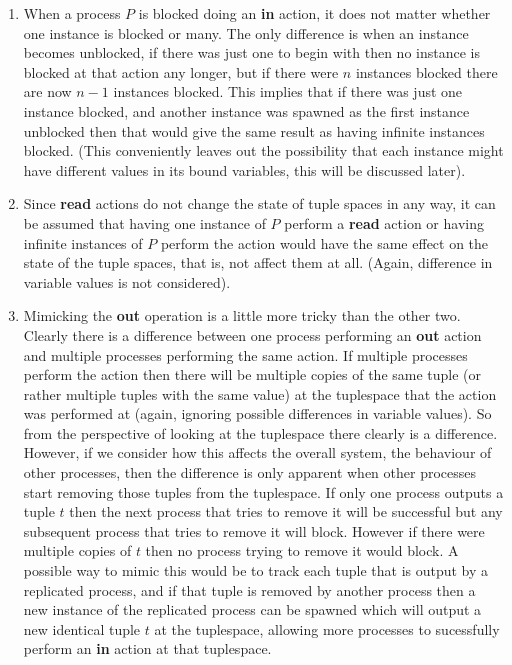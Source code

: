 	\begin{enumerate}
		\item When a process $P$ is blocked doing an \textbf{in} action, it does 
		not matter whether one instance is blocked or many. The only difference is 
		when an instance becomes unblocked, if there was just one to begin with 
		then no instance is blocked at that action any longer, but if there were 
		$n$ instances blocked there are now $n-1$ instances blocked. This implies
		that if there was just one instance blocked, and another instance was 
		spawned as the first instance unblocked then that would give the same 
		result as having infinite instances blocked. (This conveniently leaves
		out the possibility that each instance might have different values in its 
		bound variables, this will be discussed later).
	
		\item Since \textbf{read} actions do not change the state of tuple spaces
		in any way, it can be assumed that having one instance of $P$ perform a
		\textbf {read} action or having infinite instances of $P$ perform the 
		action would have the same effect on the state of the tuple spaces, that 
		is, not affect them at all. (Again, difference in variable values is not 
		considered).
		
		\item Mimicking the \textbf{out} operation is a little more tricky than 
		the other two. Clearly there is a difference between one process 
		performing an \textbf{out} action and multiple processes performing the 
		same action. If multiple processes perform the action then there will be 
		multiple copies of the same tuple (or rather multiple tuples with the same 
		value) at the tuplespace that the action was performed at (again, ignoring 
		possible differences in variable values). So from the perspective of 
		looking at the tuplespace there clearly is a difference. However, if we 
		consider how this affects the overall system, the behaviour of other 
		processes, then the difference is only apparent when other processes start 
		removing those tuples from the tuplespace. If only one process outputs a 
		tuple $t$ then the next process that tries to remove it will be successful 
		but any subsequent process that tries to remove it will block. However if 
		there were multiple copies of $t$ then no process trying to remove it 
		would block. A possible way to mimic this would be to track each tuple 
		that is output by a replicated process, and if that tuple is removed by 
		another process then a new instance of the replicated process can be 
		spawned which will output a new identical tuple $t$ at the tuplespace, 
		allowing more processes to sucessfully perform an \textbf{in} action at 
		that tuplespace.

	\end{enumerate}
	
